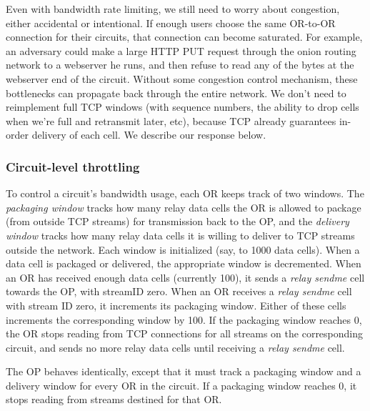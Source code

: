 \documentclass[times,10pt,twocolumn]{article}
\begin{document}
\label{subsec:congestion}

Even with bandwidth rate limiting, we still need to worry about
congestion, either accidental or intentional. If enough users choose the
same OR-to-OR connection for their circuits, that connection can become
saturated. For example, an adversary could make a large HTTP PUT request
through the onion routing network to a webserver he runs, and then
refuse to read any of the bytes at the webserver end of the
circuit. Without some congestion control mechanism, these bottlenecks
can propagate back through the entire network. We don't need to
reimplement full TCP windows (with sequence numbers,
the ability to drop cells when we're full and retransmit later, etc),
because TCP already guarantees in-order delivery of each
cell. 
We describe our response below.

\subsubsection{Circuit-level throttling}

To control a circuit's bandwidth usage, each OR keeps track of two
windows. The \emph{packaging window} tracks how many relay data cells the OR is
allowed to package (from outside TCP streams) for transmission back to the OP,
and the \emph{delivery window} tracks how many relay data cells it is willing
to deliver to TCP streams outside the network. Each window is initialized
(say, to 1000 data cells). When a data cell is packaged or delivered,
the appropriate window is decremented. When an OR has received enough
data cells (currently 100), it sends a \emph{relay sendme} cell towards the OP,
with streamID zero. When an OR receives a \emph{relay sendme} cell with stream
ID zero, it increments its packaging window. Either of these cells
increments the corresponding window by 100. If the packaging window
reaches 0, the OR stops reading from TCP connections for all streams
on the corresponding circuit, and sends no more relay data cells until
receiving a \emph{relay sendme} cell.

The OP behaves identically, except that it must track a packaging window
and a delivery window for every OR in the circuit. If a packaging window
reaches 0, it stops reading from streams destined for that OR.
\end{document}
